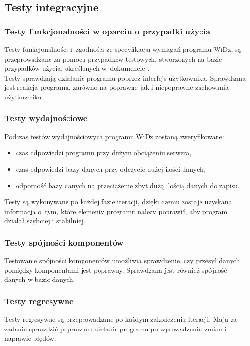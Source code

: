\documentclass[12pt,leqno,twoside]{mwart}
\begin{document}
\subsection{Testy integracyjne}
\subsubsection{Testy funkcjonalności w oparciu o przypadki użycia}
\noindent Testy funkcjonalności i~zgodności ze specyfikacją wymagań programu WiDz, są przeprowadzane za pomocą przypadków testowych, stworzonych na bazie przypadków użycia, określonych w~dokumencie \cite{PU}. \\
\indent Testy sprawdzają działanie programu poprzez interfejs użytkownika. Sprawdzana jest reakcja programu, zarówno na poprawne jak i niepoprawne zachowania użytkownika. \\
\subsubsection{Testy wydajnościowe}
\noindent Podczas testów wydajnościowych programu WiDz zostaną zweryfikowane:
\begin{itemize}
	\item czas odpowiedzi programu przy dużym obciążeniu serwera,
	\item czas odpowiedzi bazy danych przy odczycie dużej ilości danych,
	\item odporność bazy danych na przeciążenie zbyt dużą ilością danych do zapisu.
\end{itemize}
\indent Testy są wykonywane po każdej fazie iteracji, dzięki czemu zostaje uzyskana informacja o~tym, które elementy programu należy poprawić, aby program działał szybciej i stabilniej. \\
\subsubsection{Testy spójności komponentów}
\noindent Testowanie spójności komponentów umożliwia sprawdzenie, czy przesył danych pomiędzy komponentami jest poprawny. Sprawdzana jest również spójność danych w bazie danych. \\
\subsubsection{Testy regresywne}
\noindent Testy regresywne są przeprowadzane po każdym zakończeniu iteracji. Mają za zadanie sprawdzić poprawne działanie programu po wprowadzeniu zmian i naprawie błędów.\\
\end{document}
